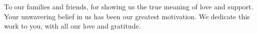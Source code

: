 \begin{dedication}

  To our families and friends, for showing us the true meaning of love and support. Your unwavering belief in us has been our greatest motivation. We dedicate this work to you, with all our love and gratitude.

\end{dedication}
